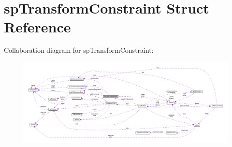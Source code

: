 \hypertarget{structspTransformConstraint}{}\section{sp\+Transform\+Constraint Struct Reference}
\label{structspTransformConstraint}


Collaboration diagram for sp\+Transform\+Constraint\+:
\nopagebreak
\begin{figure}[H]
\begin{center}
\leavevmode
\includegraphics[width=350pt]{structspTransformConstraint__coll__graph}
\end{center}
\end{figure}
